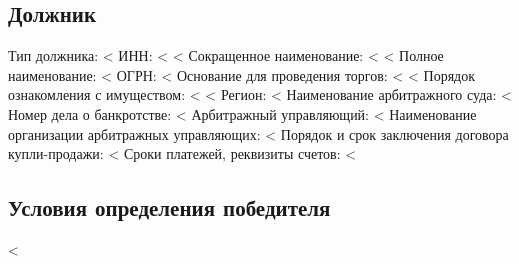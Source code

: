 \documentclass[a4paper,12pt]{article}
\begin{document}
{{{{{{{	\subsection*{Должник}
        {\color{Gray} Тип должника:} <%
        \linebreak
        {\color{Gray} ИНН:} <%
        \linebreak
        <%
            {\color{Gray} Сокращенное наименование:} <%
        	\linebreak
        <%
        {\color{Gray} Полное наименование:} <%
        \linebreak
        {\color{Gray} ОГРН:} <%
        \linebreak
        {\color{Gray} Основание для проведения торгов:} <%
        \linebreak
        <%
            {\color{Gray} Порядок ознакомления с имуществом:} <%
        	\linebreak
        <%
        {\color{Gray} Регион:} <%
        \linebreak
        {\color{Gray} Наименование арбитражного суда:} <%
        \linebreak
        {\color{Gray} Номер дела о банкротстве:} <%
        \linebreak
        {\color{Gray} Арбитражный управляющий:} <%
        \linebreak
        {\color{Gray} Наименование организации арбитражных управляющих:} <%
        \linebreak
        {\color{Gray} Порядок и срок заключения договора купли-продажи:} <%
        \linebreak
        {\color{Gray} Сроки платежей, реквизиты счетов:} <%


	\subsection*{Условия определения победителя}
		<%

}}}}}}}
\end{document}
